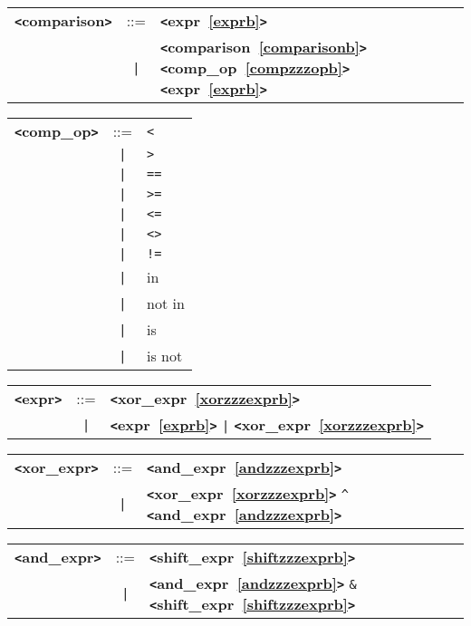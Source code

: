 \label{comparisonb}
\begin{tabular}{lcl}
{\bf \verb+<+comparison\verb+>+} & ::=  & {\bf \verb+<+expr~\ref{exprb}\verb+>+}  \\
 & \verb+|+  & {\bf \verb+<+comparison~\ref{comparisonb}\verb+>+}  {\bf \verb+<+comp\_op~\ref{compzzzopb}\verb+>+}  {\bf \verb+<+expr~\ref{exprb}\verb+>+}  \\
\end{tabular}

\label{compzzzopb}
\begin{tabular}{lcl}
{\bf \verb+<+comp\_op\verb+>+} & ::=  & \verb|<| \\
 & \verb+|+  & \verb|>| \\
 & \verb+|+  & \verb|==| \\
 & \verb+|+  & \verb|>=| \\
 & \verb+|+  & \verb|<=| \\
 & \verb+|+  & \verb|<>| \\
 & \verb+|+  & \verb|!=| \\
 & \verb+|+  & in \\
 & \verb+|+  & not in \\
 & \verb+|+  & is \\
 & \verb+|+  & is not \\
\end{tabular}

\label{exprb}
\begin{tabular}{lcl}
{\bf \verb+<+expr\verb+>+} & ::=  & {\bf \verb+<+xor\_expr~\ref{xorzzzexprb}\verb+>+}  \\
 & \verb+|+  & {\bf \verb+<+expr~\ref{exprb}\verb+>+}  \verb+|+ {\bf \verb+<+xor\_expr~\ref{xorzzzexprb}\verb+>+}  \\
\end{tabular}

\label{xorzzzexprb}
\begin{tabular}{lcl}
{\bf \verb+<+xor\_expr\verb+>+} & ::=  & {\bf \verb+<+and\_expr~\ref{andzzzexprb}\verb+>+}  \\
 & \verb+|+  & {\bf \verb+<+xor\_expr~\ref{xorzzzexprb}\verb+>+}  \verb|^| {\bf \verb+<+and\_expr~\ref{andzzzexprb}\verb+>+}  \\
\end{tabular}

\label{andzzzexprb}
\begin{tabular}{lcl}
{\bf \verb+<+and\_expr\verb+>+} & ::=  & {\bf \verb+<+shift\_expr~\ref{shiftzzzexprb}\verb+>+}  \\
 & \verb+|+  & {\bf \verb+<+and\_expr~\ref{andzzzexprb}\verb+>+}  \verb|&| {\bf \verb+<+shift\_expr~\ref{shiftzzzexprb}\verb+>+}  \\
\end{tabular}

